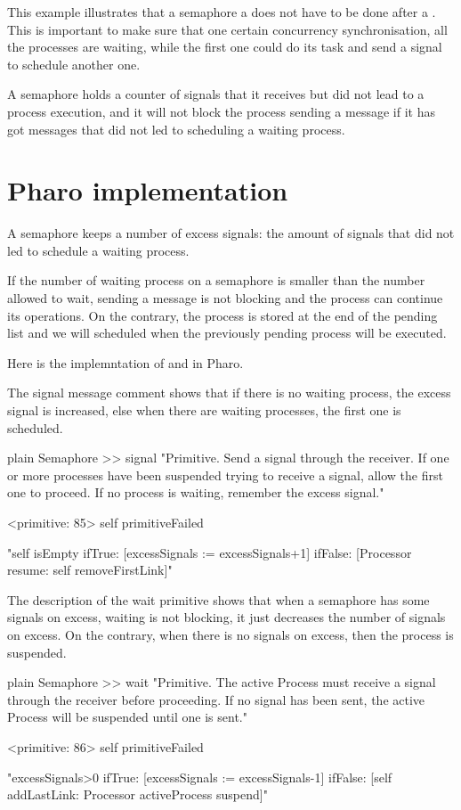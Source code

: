 \documentclass[10pt,twoside,english]{_support/latex/sbabook/sbabook}
\begin{document}
This example illustrates that a semaphore a  does not have to be done after a .
This is important to make sure that one certain concurrency synchronisation, all the processes are waiting, while the first one could do its task and send a signal to schedule another one. 

A semaphore holds a counter of signals that it receives but did not lead to a process execution, and it will not block the process sending a  message if it has got   messages that did not led to scheduling a waiting process.
\section{Pharo implementation }
A semaphore keeps a number of excess signals: the amount of signals that did not led to schedule a waiting process.

If the number of waiting process on a semaphore is smaller than the number allowed to wait, sending a  message is not blocking and the process can continue its operations. On the contrary, the process is stored at the end of the pending list and we will scheduled when the previously pending process will be executed. 

Here is the implemntation of  and  in Pharo.

The signal message comment shows that if there is no waiting process, the excess signal is increased, else when there are waiting processes, the first one is scheduled.

\begin{displaycode}{plain}
Semaphore >> signal
	"Primitive. Send a signal through the receiver. If one or more processes 
	have been suspended trying to receive a signal, allow the first one to 
	proceed. If no process is waiting, remember the excess signal."

	<primitive: 85>
	self primitiveFailed

	"self isEmpty    
		ifTrue: [excessSignals := excessSignals+1]    
		ifFalse: [Processor resume: self removeFirstLink]"
\end{displaycode}

The description of the wait primitive shows that when a semaphore has some signals on excess, waiting is not blocking, it just decreases the number of signals on excess. 
On the contrary, when there is no signals on excess, then the process is suspended.

\begin{displaycode}{plain}
Semaphore >> wait
	"Primitive. The active Process must receive a signal through the receiver 
	before proceeding. If no signal has been sent, the active Process will be 
	suspended until one is sent."

	<primitive: 86>
	self primitiveFailed

	"excessSignals>0  
		ifTrue: [excessSignals := excessSignals-1]  
		ifFalse: [self addLastLink: Processor activeProcess suspend]"
\end{displaycode}
\end{document}
